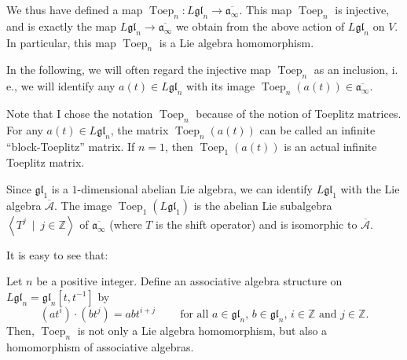 \documentclass[etingof-lie.tex]{subfiles}
\begin{document}
\begin{definition}
We thus have defined a map $\operatorname*{Toep}\nolimits_{n}:L\mathfrak{gl}%
_{n}\rightarrow\overline{\mathfrak{a}_{\infty}}$. This map
$\operatorname*{Toep}\nolimits_{n}$ is injective, and is exactly the map
$L\mathfrak{gl}_{n}\rightarrow\overline{\mathfrak{a}_{\infty}}$ we obtain from
the above action of $L\mathfrak{gl}_{n}$ on $V$. In particular, this map
$\operatorname*{Toep}\nolimits_{n}$ is a Lie algebra homomorphism.

In the following, we will often regard the injective map $\operatorname*{Toep}%
\nolimits_{n}$ as an inclusion, i. e., we will identify any $a\left(
t\right)  \in L\mathfrak{gl}_{n}$ with its image $\operatorname*{Toep}%
\nolimits_{n}\left(  a\left(  t\right)  \right)  \in\overline{\mathfrak{a}%
_{\infty}}$.
\end{definition}

Note that I chose the notation $\operatorname*{Toep}\nolimits_{n}$ because of
the notion of Toeplitz matrices. For any $a\left(  t\right)  \in
L\mathfrak{gl}_{n}$, the matrix $\operatorname*{Toep}\nolimits_{n}\left(
a\left(  t\right)  \right)  $ can be called an infinite ``block-Toeplitz''
matrix. If $n=1$, then $\operatorname*{Toep}\nolimits_{1}\left(  a\left(
t\right)  \right)  $ is an actual infinite Toeplitz matrix.

\begin{example}
Since $\mathfrak{gl}_{1}$ is a $1$-dimensional abelian Lie algebra, we can
identify $L\mathfrak{gl}_{1}$ with the Lie algebra $\overline{\mathcal{A}}$.
The image $\operatorname*{Toep}\nolimits_{1}\left(  L\mathfrak{gl}_{1}\right)
$ is the abelian Lie subalgebra $\left\langle T^{j}\ \mid\ j\in\mathbb{Z}%
\right\rangle $ of $\overline{\mathfrak{a}_{\infty}}$ (where $T$ is the shift
operator) and is isomorphic to $\overline{\mathcal{A}}$.
\end{example}

It is easy to see that:

\begin{proposition}
\label{prop.Toep.alg}Let $n$ be a positive integer. Define an associative
algebra structure on $L\mathfrak{gl}_{n}=\mathfrak{gl}_{n}\left[
t,t^{-1}\right]  $ by%
\[
\left(  at^{i}\right)  \cdot\left(  bt^{j}\right)  =abt^{i+j}%
\ \ \ \ \ \ \ \ \ \ \text{for all }a\in\mathfrak{gl}_{n}\text{, }%
b\in\mathfrak{gl}_{n}\text{, }i\in\mathbb{Z}\text{ and }j\in\mathbb{Z}.
\]
Then, $\operatorname*{Toep}\nolimits_{n}$ is not only a Lie algebra
homomorphism, but also a homomorphism of associative algebras.
\end{proposition}
\end{document}
